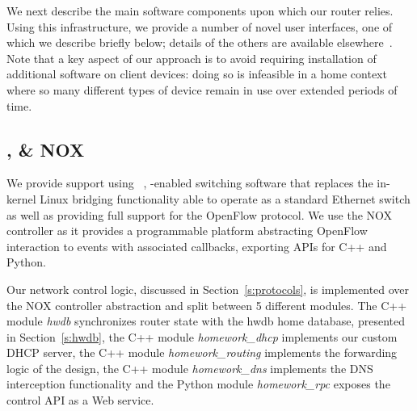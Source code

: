 We next describe the main software components upon which our router relies.
Using this infrastructure, we provide a number of novel user interfaces, one of
which we describe briefly below; details of the others are available
elsewhere~\cite{mortier11:_suppor_novel_home_networ_manag}.  Note that a key
aspect of our approach is to avoid requiring installation of additional
software on client devices: doing so is infeasible in a home context where so
many different types of device remain in use over extended periods of time.

\subsection{\of, \ovs \& NOX} \label{s:openflow}

We provide \of support using \ovs~\cite{openvswitch}, \of-enabled switching
software that replaces the in-kernel Linux bridging functionality able to
operate as a standard Ethernet switch as well as providing full support for the
OpenFlow protocol.  We use the NOX~\cite{nox} controller as it provides a
programmable platform abstracting OpenFlow interaction to events with associated
callbacks, exporting APIs for C++ and Python.

Our network control logic, discussed in Section~\ref{s:protocols}, is implemented
over the NOX controller abstraction and split between 5 different modules. The
C++ module {\it hwdb} synchronizes router state with the hwdb home database,
presented in Section~\ref{s:hwdb}, the C++ module {\it homework\_dhcp}
implements our custom DHCP server, the C++ module {\it homework\_routing}
implements the forwarding logic of the design, the C++ module {\it homework\_dns}
implements the DNS interception functionality and the Python module {\it
  homework\_rpc} exposes the control API as a Web service. 

